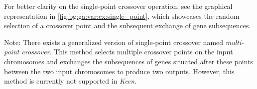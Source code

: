   For better clarity on the single-point crossover operation, see the graphical 
  representation in \vref{fig:bg:ga:var:cx:single_point}, which showcases the 
  random selection of a crossover point and the subsequent exchange of gene 
  subsequences.

  Note: There exists a generalized version of single-point crossover named 
  \textit{multi-point crossover}. This method selects multiple crossover points 
  on the input chromosomes and exchanges the subsequences of genes situated 
  after these points between the two input chromosomes to produce two 
  outputs. However, this method is currently not supported in \textit{Keen}.
